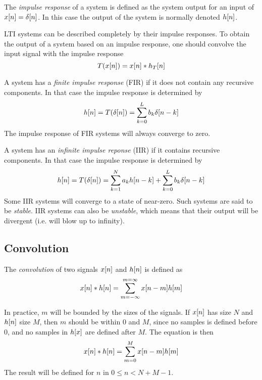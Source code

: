 \documentclass[11pt]{article}
\let\originalleft\left
\let\originalright\right
\renewcommand{\left}{\mathopen{}\mathclose\bgroup\originalleft}
\renewcommand{\right}{\aftergroup\egroup\originalright}
\def\lsqb{\left[}
\def\rsqb{\right]}
\def\sqb#1{\lsqb #1 \rsqb}
\def\xsig{x\sqb{n}}
\begin{document}
The \textit{impulse response} of a system is defined as the system output for an input of $\xsig = \delta\sqb{n}$. In this
case the output of the system is normally denoted $h\sqb{n}$.

LTI systems can be described completely by their impulse responses. To obtain the output of a system based on an impulse response, one should convolve the input signal with the impulse response
\begin{equation}
    T(\xsig) = \xsig * h_T\sqb{n}
\end{equation}

A system has a \textit{finite impulse response} (FIR) if it does not contain any recursive components. In that case the impulse response is determined by
\begin{equation}
    h\sqb{n} = T(\delta\sqb{n}) = \sum_{k = 0}^L b_k \delta\sqb{n - k}
\end{equation}
The impulse response of FIR systems will always converge to zero.

A system has an \textit{infinite impulse reponse} (IIR) if it contains recursive components. In that case the impulse response is determined by
\begin{equation}
    h\sqb{n} = T(\delta\sqb{n}) = \sum_{k=1}^N a_k h\sqb{n - k} + \sum_{k = 0}^L b_k \delta\sqb{n - k}
\end{equation}
Some IIR systems will converge to a state of near-zero. Such systems are said to be \textit{stable}. IIR systems can also be \textit{unstable}, which means that their output will be divergent (i.e. will blow up to infinity).

\subsection{Convolution}
The \textit{convolution} of two signals $\xsig$ and $h\sqb{n}$ is defined as
\begin{equation}
    \xsig * h\sqb{n} = \sum_{m = -\infty}^{m = \infty} x\sqb{n - m}h\sqb{m}
\end{equation}

In practice, $m$ will be bounded by the sizes of the signals. If $\xsig$ has size $N$ and $h\sqb{n}$ size $M$, then $m$ should be within $0$ and $M$, since no samples is defined before $0$, and no samples in $h\sqb{x}$ are defined after $M$. The equation is then
\begin{equation}
    \xsig * h\sqb{n} = \sum_{m = 0}^{M} x\sqb{n - m}h\sqb{m}
\end{equation}
The result will be defined for $n$ in $0 \leq n < N + M - 1$.
\end{document}
